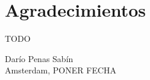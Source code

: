 %
%

\section*{Agradecimientos}

TODO


\begin{flushright}
  Darío Penas Sabín \\
  Amsterdam, PONER FECHA
\end{flushright}


